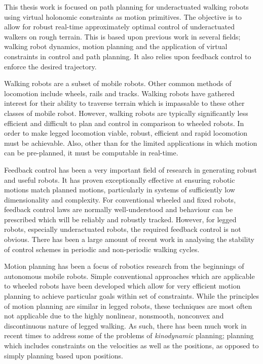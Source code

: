 This thesis work is focused on path planning for underactuated walking robots using virtual holonomic constraints as motion primitives. The objective is to allow for robust real-time approximately optimal control of underactuated walkers on rough terrain. This is based upon previous work in several fields; walking robot dynamics, motion planning and the application of virtual constraints in control and path planning. It also relies upon feedback control to enforce the desired trajectory.

Walking robots are a subset of mobile robots. Other common methods of locomotion include wheels, rails and tracks. Walking robots have gathered interest for their ability to traverse terrain which is impassable to these other classes of mobile robot. However, walking robots are typically significantly less efficient and difficult to plan and control in comparison to wheeled robots. In order to make legged locomotion viable, robust, efficient and rapid locomotion must be achievable. Also, other than for the limited applications in which motion can be pre-planned, it must be computable in real-time.

Feedback control has been a very important field of research in generating robust and useful robots. It has proven exceptionally effective at ensuring robotic motions match planned motions, particularly in systems of sufficiently low dimensionality and complexity. For conventional wheeled and fixed robots, feedback control laws are normally well-understood and behaviour can be prescribed which will be reliably and robustly tracked. However, for legged robots, especially underactuated robots, the required feedback control is not obvious. There has been a large amount of recent work in analysing the stability of control schemes in periodic and non-periodic walking cycles.

Motion planning has been a focus of robotics research from the beginnings of autonomous mobile robots. Simple conventional approaches which are applicable to wheeled robots have been developed which allow for very efficient motion planning to achieve particular goals within set of constraints. While the principles of motion planning are similar in legged robots, these techniques are most often not applicable due to the highly nonlinear, nonsmooth, nonconvex and discontinuous nature of legged walking. As such, there has been much work in recent times to address some of the problems of \textit{kinodynamic} planning; planning which includes constraints on the velocities as well as the positions, as opposed to simply planning based upon positions.

